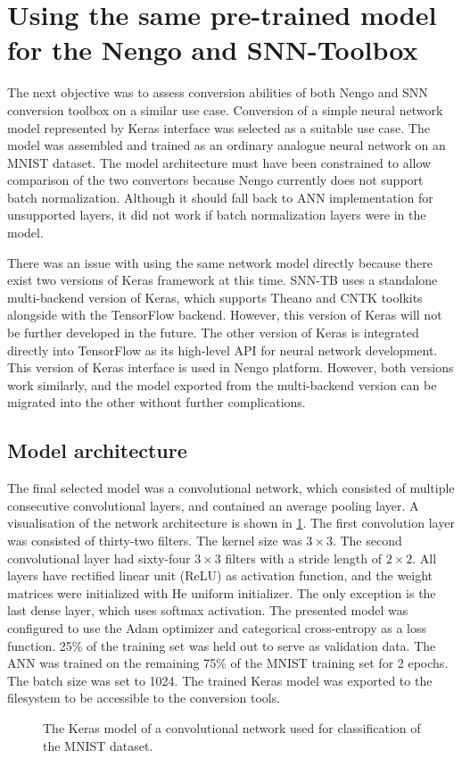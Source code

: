 \section{Using the same pre-trained model for the Nengo and SNN-Toolbox}
The next objective was to assess conversion abilities of both Nengo and SNN conversion toolbox on a similar use case. Conversion of a simple neural network model represented by Keras interface was selected as a suitable use case. The model was assembled and trained as an ordinary analogue neural network on an MNIST dataset. The model architecture must have been constrained to allow comparison of the two convertors because Nengo currently does not support batch normalization. Although it should fall back to ANN implementation for unsupported layers, it did not work if batch normalization layers were in the model.\par
There was an issue with using the same network model directly because there exist two versions of Keras framework at this time. SNN-TB uses a standalone multi-backend version of Keras, which supports Theano and CNTK toolkits alongside with the TensorFlow backend. However, this version of Keras will not be further developed in the future. The other version of Keras is integrated directly into TensorFlow as its high-level API for neural network development. This version of Keras interface is used in Nengo platform. However, both versions work similarly, and the model exported from the multi-backend version can be migrated into the other without further complications.

\subsection{Model architecture}
The final selected model was a convolutional network, which consisted of multiple consecutive convolutional layers, and contained an average pooling layer. A visualisation of the network architecture is shown in \cref{fig:keras_model}. The first convolution layer was consisted of thirty-two filters. The kernel size was $3 \times 3$. The second convolutional layer had sixty-four $3 \times 3$ filters with a stride length of $2 \times 2$. All layers have rectified linear unit (ReLU) as activation function, and the weight matrices were initialized with He uniform initializer. The only exception is the last dense layer, which uses softmax activation. The presented model was configured to use the Adam \cite{kingmaAdamMethod17} optimizer and categorical cross-entropy as a loss function. 25\% of the training set was held out to serve as validation data. The ANN was trained on the remaining 75\% of the MNIST training set for 2 epochs. The batch size was set to 1024. The trained Keras model was exported to the filesystem to be accessible to the conversion tools. \par
\begin{figure}[htbp]
    \centering
    
    \caption{The Keras model of a convolutional network used for classification of the MNIST dataset.}
    \label{fig:keras_model}
\end{figure}

